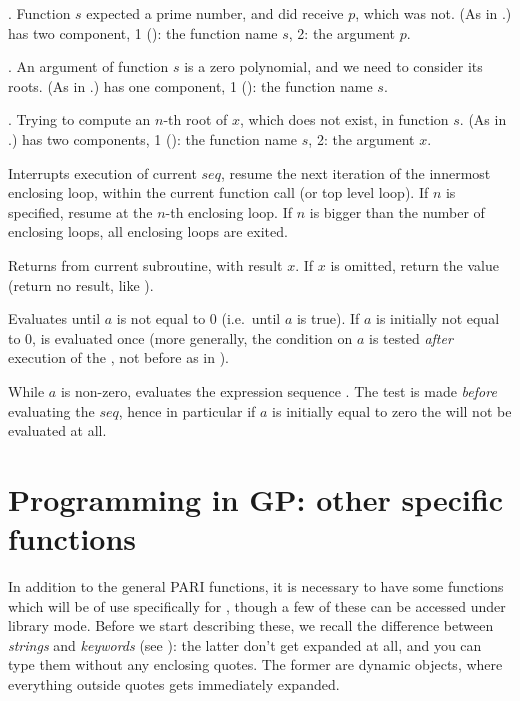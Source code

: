  \item {}. Function $s$ expected a prime number,
 and did receive $p$, which was not. (As in .)
  has two component, 1 (): the function name $s$,
 2: the argument $p$.

 \item {}. An argument of function $s$ is a zero polynomial,
 and we need to consider its roots. (As in .)  has
 one component, 1 (): the function name $s$.

 \item {}. Trying to compute an $n$-th root of $x$, which does
 not exist, in function $s$. (As in .)
  has two components, 1 (): the function name $s$,
 2: the argument $x$.

\label{se:next}
Interrupts execution of current $seq$,
resume the next iteration of the innermost enclosing loop, within the
current function call (or top level loop). If $n$ is specified, resume at
the $n$-th enclosing loop. If $n$ is bigger than the number of enclosing
loops, all enclosing loops are exited.

\label{se:return}
Returns from current subroutine, with
result $x$. If $x$ is omitted, return the  value (return no
result, like ).

\label{se:until}
Evaluates  until $a$ is not
equal to 0 (i.e.~until $a$ is true). If $a$ is initially not equal to 0,
 is evaluated once (more generally, the condition on $a$ is tested
\emph{after} execution of the , not before as in ).

\label{se:while}
While $a$ is non-zero, evaluates the expression sequence . The
test is made \emph{before} evaluating the $seq$, hence in particular if $a$
is initially equal to zero the  will not be evaluated at all.

\section{Programming in GP: other specific functions}
\label{se:gp_program}

  In addition to the general PARI functions, it is necessary to have some
functions which will be of use specifically for , though a few of these can
be accessed under library mode. Before we start describing these, we recall
the difference between \emph{strings} and \emph{keywords} (see
): the latter don't get expanded at all, and you can type
them without any enclosing quotes. The former are dynamic objects, where
everything outside quotes gets immediately expanded.


